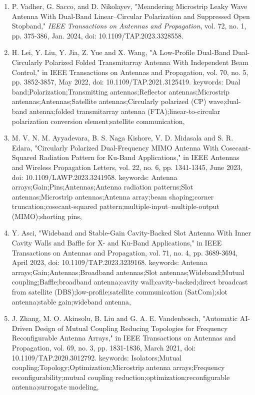 \documentclass[12pt]{article}
\begin{document}
\begin{enumerate}
    \item P. Vadher, G. Sacco, and D. Nikolayev, "Meandering Microstrip Leaky Wave Antenna With Dual-Band Linear–Circular Polarization and Suppressed Open Stopband," \textit{IEEE Transactions on Antennas and Propagation}, vol. 72, no. 1, pp. 375-386, Jan. 2024, doi: 10.1109/TAP.2023.3328558.

		\item H. Lei, Y. Liu, Y. Jia, Z. Yue and X. Wang, "A Low-Profile Dual-Band Dual-Circularly Polarized Folded Transmitarray Antenna With Independent Beam Control," in IEEE Transactions on Antennas and Propagation, vol. 70, no. 5, pp. 3852-3857, May 2022, doi: 10.1109/TAP.2021.3125419.
keywords: {Dual band;Polarization;Transmitting antennas;Reflector antennas;Microstrip antennas;Antennas;Satellite antennas;Circularly polarized (CP) wave;dual-band antenna;folded transmitarray antenna (FTA);linear-to-circular polarization conversion element;satellite communication},

		\item M. V. N. M. Ayyadevara, B. S. Naga Kishore, V. D. Midasala and S. R. Edara, "Circularly Polarized Dual-Frequency MIMO Antenna With Cosecant-Squared Radiation Pattern for Ku-Band Applications," in IEEE Antennas and Wireless Propagation Letters, vol. 22, no. 6, pp. 1341-1345, June 2023, doi: 10.1109/LAWP.2023.3241958.
keywords: {Antenna arrays;Gain;Pins;Antennas;Antenna radiation patterns;Slot antennas;Microstrip antennas;Antenna array;beam shaping;corner truncation;cosecant-squared pattern;multiple-input–multiple-output (MIMO);shorting pins},

		\item Y. Asci, "Wideband and Stable-Gain Cavity-Backed Slot Antenna With Inner Cavity Walls and Baffle for X- and Ku-Band Applications," in IEEE Transactions on Antennas and Propagation, vol. 71, no. 4, pp. 3689-3694, April 2023, doi: 10.1109/TAP.2023.3239168.
keywords: {Antenna arrays;Gain;Antennas;Broadband antennas;Slot antennas;Wideband;Mutual coupling;Baffle;broadband antenna;cavity wall;cavity-backed;direct broadcast from satellite (DBS);low-profile;satellite communication (SatCom);slot antenna;stable gain;wideband antenna},

		\item J. Zhang, M. O. Akinsolu, B. Liu and G. A. E. Vandenbosch, "Automatic AI-Driven Design of Mutual Coupling Reducing Topologies for Frequency Reconfigurable Antenna Arrays," in IEEE Transactions on Antennas and Propagation, vol. 69, no. 3, pp. 1831-1836, March 2021, doi: 10.1109/TAP.2020.3012792.
keywords: {Isolators;Mutual coupling;Topology;Optimization;Microstrip antenna arrays;Frequency reconfigurability;mutual coupling reduction;optimization;reconfigurable antenna;surrogate modeling},


\end{enumerate}
\end{document}
